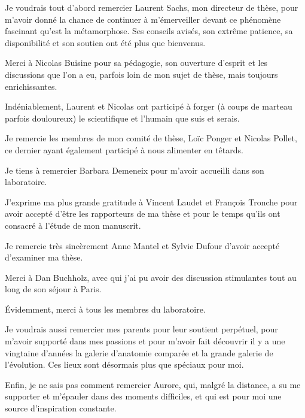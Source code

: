 \documentclass[../main.tex]{subfiles}
\begin{document}
Je voudrais tout d'abord remercier Laurent Sachs, mon directeur de thèse, pour m'avoir donné la chance de continuer à m’émerveiller devant ce phénomène fascinant qu'est la métamorphose. Ses conseils avisés, son extrême patience, sa disponibilité et son soutien ont été plus que bienvenus.
\par
Merci à Nicolas Buisine pour sa pédagogie, son ouverture d'esprit et les discussions que l'on a eu, parfois loin de mon sujet de thèse, mais toujours enrichissantes.
\par
Indéniablement, Laurent et Nicolas ont participé à forger (à coups de marteau parfois douloureux) le scientifique et l'humain que suis et serais.
\par
Je remercie les membres de mon comité de thèse, Loïc Ponger et Nicolas Pollet, ce dernier ayant également participé à nous alimenter en têtards.
\par
Je tiens à remercier Barbara Demeneix pour m'avoir accueilli dans son laboratoire.
\par
J'exprime ma plus grande gratitude à Vincent Laudet et François Tronche pour avoir accepté d'être les rapporteurs de ma thèse et pour le temps qu'ils ont consacré à l'étude de mon manuscrit.
\par
Je remercie très sincèrement Anne Mantel et Sylvie Dufour d'avoir accepté d’examiner ma thèse.
\par
Merci à Dan Buchholz, avec qui j'ai pu avoir des discussion stimulantes tout au long de son séjour à Paris.
\par
Évidemment, merci à tous les membres du laboratoire.
\par
Je voudrais aussi remercier mes parents pour leur soutient perpétuel, pour m'avoir supporté dans mes passions et pour m'avoir fait découvrir il y a une vingtaine d'années la galerie d'anatomie comparée et la grande galerie de l'évolution.
Ces lieux sont désormais plus que spéciaux pour moi.
\par
Enfin, je ne sais pas comment remercier Aurore, qui, malgré la distance, a su me supporter et m'épauler dans des moments difficiles, et qui est pour moi une source d'inspiration constante.

\clearpage
\end{document}
